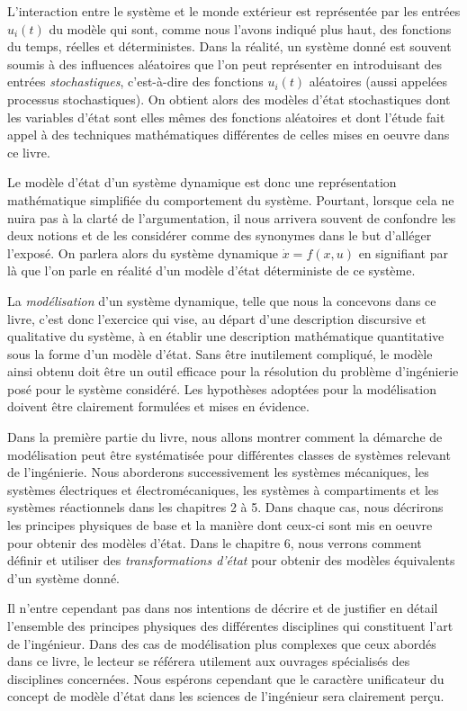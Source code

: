 L'interaction entre le système et le \og monde extérieur \gf est représentée par les entrées $u_i(t)$ du modèle qui sont, comme nous l'avons indiqué plus haut, des fonctions du temps, réelles et déterministes. Dans la réalité, un système donné est souvent soumis à des influences aléatoires que l'on peut représenter en introduisant des entrées {\it stochastiques}, c'est-à-dire des fonctions $u_i(t)$ aléatoires (aussi appelées processus stochastiques). On obtient alors des modèles d'état stochastiques dont les variables d'état sont elles mêmes des fonctions aléatoires et dont l'étude fait appel à des techniques mathématiques  différentes de celles mises en oeuvre dans ce livre.

Le modèle d'état d'un système dynamique est donc une représentation mathématique simplifiée du comportement du système. Pourtant,  lorsque cela ne nuira pas à la clarté de l'argumentation, il nous arrivera souvent de confondre les deux notions et de les considérer comme des synonymes dans le but d'alléger l'exposé. On parlera alors du système dynamique $\dot x = f(x,u)$ en signifiant par là que l'on parle en réalité d'un modèle d'état déterministe de ce système.

La {\it modélisation} d'un système dynamique, telle que nous la concevons dans ce livre, c'est donc l'exercice qui vise, au départ d'une description discursive et qualitative du système, à en établir une description mathématique quantitative sous la forme d'un modèle d'état. Sans être inutilement compliqué, le modèle ainsi obtenu doit être un outil efficace pour la résolution du problème d'ingénierie posé pour le système considéré. Les hypothèses adoptées pour la modélisation doivent être clairement formulées et mises en évidence.

Dans la première partie du livre, nous allons montrer
comment la démarche de modélisation peut être systématisée pour différentes
classes de systèmes relevant de l'ingénierie.  Nous aborderons successivement les systèmes
méca\-niques, les systèmes électriques et électromécaniques, les systèmes à
compartiments et les systèmes réactionnels dans les chapitres 2 à 5.  Dans chaque cas, nous
décrirons les principes physiques de base et la manière dont ceux-ci sont
mis en oeuvre pour obtenir des modèles d'état. Dans le chapitre 6, nous verrons comment définir et utiliser des {\it transformations d'état} pour obtenir des modèles équivalents d'un système donné. 

Il n'entre cependant pas dans nos intentions de
décrire et de justifier en détail l'ensemble des principes physiques des
différentes disciplines qui constituent l'art de l'ingénieur.  Dans des
cas de modélisation plus complexes que ceux abordés dans ce livre, le lecteur se référera utilement aux
ouvrages spécialisés des disciplines concernées. Nous espérons cependant que le caractère unificateur du concept de modèle d'état dans les sciences de l'ingénieur sera clairement per\c{c}u. 

